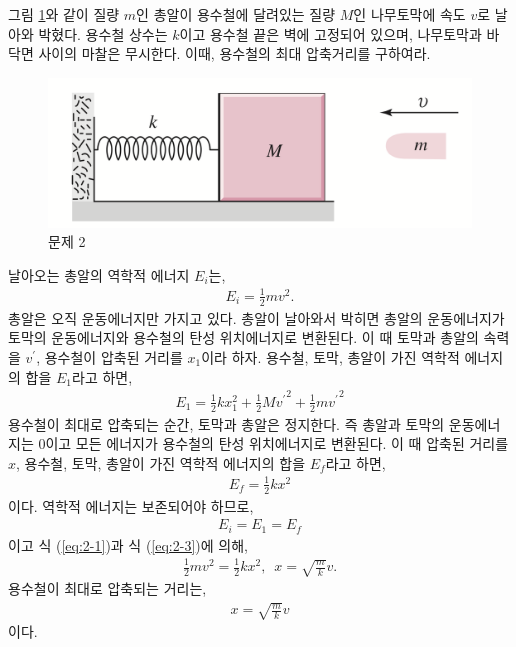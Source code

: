 \documentclass[floatfix,nofootinbib,superscriptaddress,fleqn]{revtex4-2}
\begin{document}
\vspace{1cm}
그림 \ref{fig:2}와 같이 질량 $m$인 총알이 용수철에 달려있는 질량 $M$인
나무토막에 속도 $v$로 날아와 박혔다. 용수철 상수는 $k$이고 용수철 끝은
벽에 고정되어 있으며, 나무토막과 바닥면 사이의 마찰은 무시한다. 이때,
용수철의 최대 압축거리를 구하여라. 
\begin{figure}[ht]
  \centering
\includegraphics[scale=0.4]{Qfig11-2-20220406.png}
  \caption{문제 2}
  \label{fig:2}
\end{figure}

날아오는 총알의 역학적 에너지 $E_i$는,
\begin{align}\label{eq:2-1}
  E_i = \frac{1}{2}mv^2.
\end{align}
총알은 오직 운동에너지만 가지고 있다. 총알이 날아와서 박히면 총알의 
운동에너지가 토막의 운동에너지와 용수철의 탄성 위치에너지로 변환된다.
이 때 토막과 총알의 속력을 $v^\prime$, 용수철이 압축된 거리를 $x_1$이라 하자.
용수철, 토막, 총알이 가진 역학적 에너지의 합을 $E_1$라고 하면,
\begin{align}
E_1=\frac{1}{2}kx_1^2+\frac{1}{2}M{v^\prime}^2+\frac{1}{2}m{v^\prime}^2
\end{align}
용수철이 최대로 압축되는 순간, 토막과 총알은 정지한다. 즉 총알과 토막의
운동에너지는 0이고 모든 에너지가 용수철의 탄성 위치에너지로 변환된다. 
이 때 압축된 거리를 $x$, 용수철, 토막, 총알이 가진 역학적 에너지의 합을 
$E_f$라고 하면,
\begin{align}\label{eq:2-3}
  E_f = \frac{1}{2}kx^2
\end{align}
이다. 역학적 에너지는 보존되어야 하므로,
\begin{align}
  E_i = E_1 = E_f
\end{align}
이고 식 (\ref{eq:2-1})과 식 (\ref{eq:2-3})에 의해,
\begin{align}
  \frac{1}{2}mv^2=\frac{1}{2}kx^2,\,\,\,x=\sqrt{\frac{m}{k}}v.
\end{align}
용수철이 최대로 압축되는 거리는,
\begin{align}
  x=\sqrt{\frac{m}{k}}v
\end{align}
이다.
\vspace{1cm}
\end{document}

